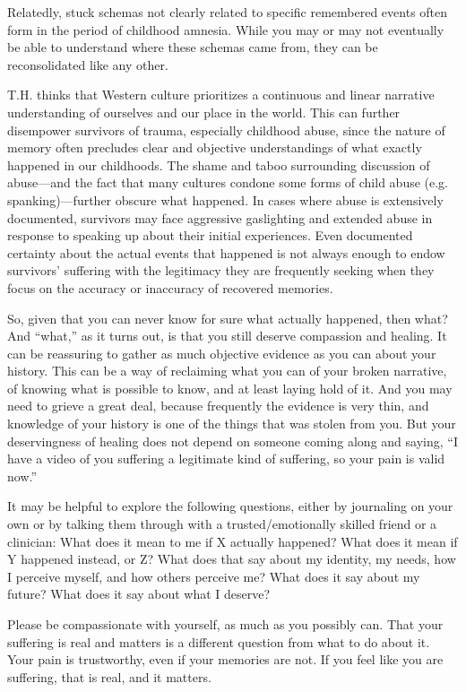 \documentclass[11pt,oneside]{book}
\newcommand{\writtenByDay}[1]{#1}
\begin{document}
Relatedly, stuck schemas not clearly related to specific remembered events often form in the period of childhood amnesia. While you may or may not eventually be able to understand where these schemas came from, they can be reconsolidated like any other.

\writtenByDay{
T.H. thinks that Western culture prioritizes a continuous and linear narrative understanding of ourselves and our place in the world. This can further disempower survivors of trauma, especially childhood abuse, since the nature of memory often precludes clear and objective understandings of what exactly happened in our childhoods. The shame and taboo surrounding discussion of abuse---and the fact that many cultures condone some forms of child abuse (e.g. spanking)---further obscure what happened. In cases where abuse is extensively documented, survivors may face aggressive gaslighting and extended abuse in response to speaking up about their initial experiences. Even documented certainty about the actual events that happened is not always enough to endow survivors' suffering with the legitimacy they are frequently seeking when they focus on the accuracy or inaccuracy of recovered memories.

So, given that you can never know for sure what actually happened, then what? And \enquote{what,} as it turns out, is that you still deserve compassion and healing. It can be reassuring to gather as much objective evidence as you can about your history. This can be a way of reclaiming what you can of your broken narrative, of knowing what is possible to know, and at least laying hold of it. And you may need to grieve a great deal, because frequently the evidence is very thin, and knowledge of your history is one of the things that was stolen from you. But your deservingness of healing does not depend on someone coming along and saying, \enquote{I have a video of you suffering a legitimate kind of suffering, so your pain is valid now.}

It may be helpful to explore the following questions, either by journaling on your own or by talking them through with a trusted/emotionally skilled friend or a clinician: What does it mean to me if X actually happened? What does it mean if Y happened instead, or Z? What does that say about my identity, my needs, how I perceive myself, and how others perceive me? What does it say about my future? What does it say about what I deserve?

Please be compassionate with yourself, as much as you possibly can. That your suffering is real and matters is a different question from what to do about it. Your pain is trustworthy, even if your memories are not. If you feel like you are suffering, that is real, and it matters.
}
\end{document}
